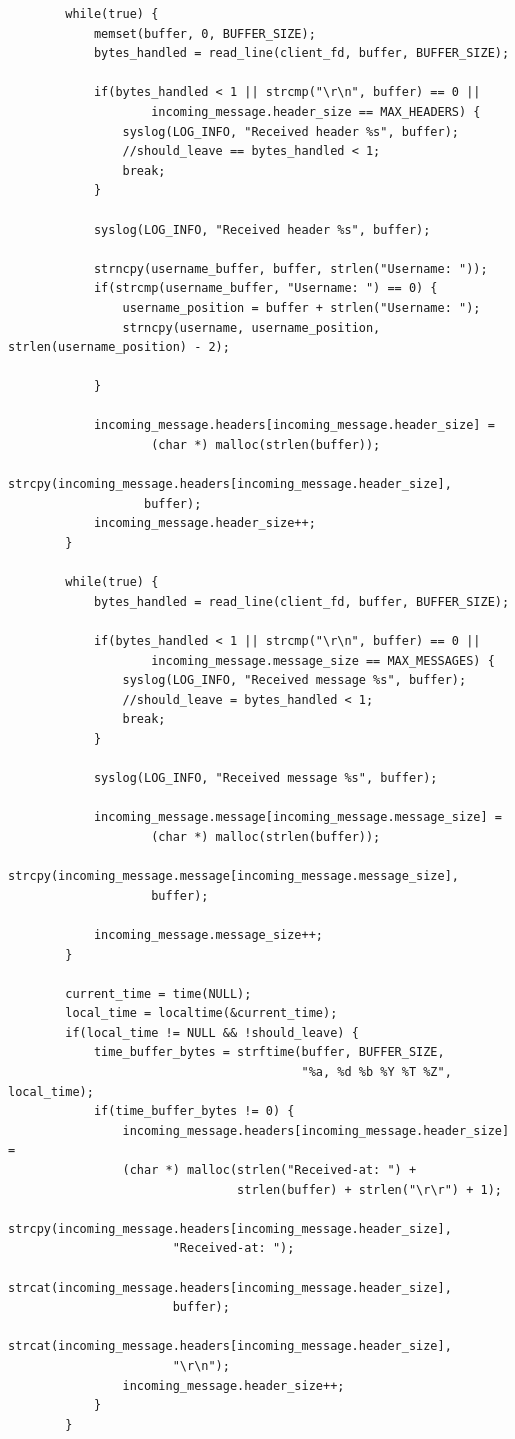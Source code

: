 \documentclass{article}
\begin{document}
\begin{verbatim}
        while(true) {
            memset(buffer, 0, BUFFER_SIZE);
            bytes_handled = read_line(client_fd, buffer, BUFFER_SIZE);
            
            if(bytes_handled < 1 || strcmp("\r\n", buffer) == 0 ||
                    incoming_message.header_size == MAX_HEADERS) {
                syslog(LOG_INFO, "Received header %s", buffer);
                //should_leave == bytes_handled < 1;
                break;
            }
            
            syslog(LOG_INFO, "Received header %s", buffer);
            
            strncpy(username_buffer, buffer, strlen("Username: "));
            if(strcmp(username_buffer, "Username: ") == 0) {
                username_position = buffer + strlen("Username: ");
                strncpy(username, username_position, strlen(username_position) - 2);
                
            }
                        
            incoming_message.headers[incoming_message.header_size] =
                    (char *) malloc(strlen(buffer));
            strcpy(incoming_message.headers[incoming_message.header_size],
                   buffer);
            incoming_message.header_size++;
        }
        
        while(true) {
            bytes_handled = read_line(client_fd, buffer, BUFFER_SIZE);
            
            if(bytes_handled < 1 || strcmp("\r\n", buffer) == 0 ||
                    incoming_message.message_size == MAX_MESSAGES) {
                syslog(LOG_INFO, "Received message %s", buffer);
                //should_leave = bytes_handled < 1;
                break;
            }
            
            syslog(LOG_INFO, "Received message %s", buffer);
            
            incoming_message.message[incoming_message.message_size] =
                    (char *) malloc(strlen(buffer));
            strcpy(incoming_message.message[incoming_message.message_size],
                    buffer);
            
            incoming_message.message_size++;
        }
        
        current_time = time(NULL);
        local_time = localtime(&current_time);
        if(local_time != NULL && !should_leave) {
            time_buffer_bytes = strftime(buffer, BUFFER_SIZE,
                                         "%a, %d %b %Y %T %Z", local_time);
            if(time_buffer_bytes != 0) {
                incoming_message.headers[incoming_message.header_size] =
                (char *) malloc(strlen("Received-at: ") +
                                strlen(buffer) + strlen("\r\r") + 1);
                strcpy(incoming_message.headers[incoming_message.header_size],
                       "Received-at: ");
                strcat(incoming_message.headers[incoming_message.header_size],
                       buffer);
                strcat(incoming_message.headers[incoming_message.header_size],
                       "\r\n");
                incoming_message.header_size++;
            }
        }
        

\end{verbatim}
\end{document}
